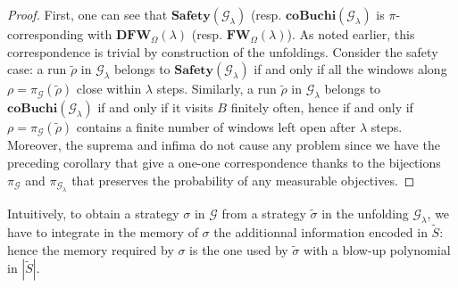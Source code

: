 \documentclass{article}
\newcommand{\CG}{\mathcal{G}}
\newcommand{\Safety}{\textbf{Safety}}
\newcommand{\coBuchi}{\textbf{coBuchi}}
\newcommand{\DFW}{\textbf{DFW}}
\newcommand{\FW}{\textbf{FW}}
\theoremstyle{plain}
\begin{document}
\begin{proof}
First, one can see that $\Safety(\CG_{\lambda})$ (resp. $\coBuchi(\CG_{\lambda})$ is $\pi$-corresponding with $\DFW_{\Omega}(\lambda)$ (resp. $\FW_{\Omega}(\lambda)$).  As noted earlier, this correspondence is trivial by construction of the unfoldings. Consider the safety case: a run $\tilde{\rho}$ in $\CG_{\lambda}$ belongs to $\Safety(\CG_{\lambda})$ if and only if all the windows along $\rho = \pi_{\CG}(\tilde{\rho})$ close within $\lambda$ steps. Similarly, a run $\tilde{\rho}$ in $\CG_{\lambda}$ belongs to $\coBuchi(\CG_{\lambda})$ if and only if it visits $B$ finitely often, hence if and only if $\rho = \pi_{\CG}(\tilde{\rho})$ contains a finite number of windows left open after $\lambda$ steps.
Moreover, the suprema and infima do not cause any problem since we have the preceding corollary that give a one-one correspondence thanks to the bijections $\pi_{\CG}$ and $\pi_{\CG_{\lambda}}$ that preserves the probability of any measurable objectives.
\end{proof}

Intuitively, to obtain a strategy $\sigma$ in $\CG$ from a strategy $\tilde{\sigma}$ in the unfolding $\CG_{\lambda}$, we have to integrate in the memory of $\sigma$ the additionnal information encoded in $\tilde{S}$: hence the memory required by $\sigma$ is the one used by $\tilde{\sigma}$ with a blow-up polynomial in $|\tilde{S}|$.
\end{document}
